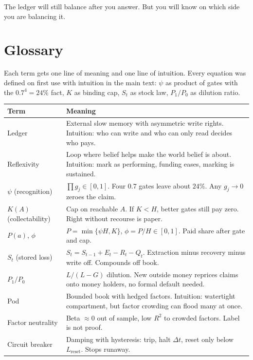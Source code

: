 \documentclass[11pt]{article}
\begin{document}
The ledger will still balance after you answer. But you will know on which side you are balancing it.

\appendix
\section{Glossary}
\label{app:glossary}

Each term gets one line of meaning and one line of intuition. Every equation was defined on first use with intuition in the main text: $\psi$ as product of gates with the $0.7^4=24\%$ fact, $K$ as binding cap, $S_t$ as stock law, $P_1/P_0$ as dilution ratio.

\begin{center}
\small
\begin{tabular}{p{2.9cm}p{9.1cm}}
\toprule
Term & Meaning \\
\midrule
Ledger & External slow memory with asymmetric write rights. Intuition: who can write and who can only read decides who pays. \\
Reflexivity & Loop where belief helps make the world belief is about. Intuition: mark as performing, funding eases, marking is sustained. \\
$\psi$ (recognition) & $\prod g_j\in[0,1]$. Four $0.7$ gates leave about $24\%$. Any $g_j\to0$ zeroes the claim. \\
$K(A)$ (collectability) & Cap on reachable $A$. If $K<H$, better gates still pay zero. Right without recourse is paper. \\
$P(a)$, $\phi$ & $P=\min\{\psi H,K\}$, $\phi=P/H\in[0,1]$. Paid share after gate and cap. \\
$S_t$ (stored loss) & $S_t=S_{t-1}+E_t-R_t-Q_t$. Extraction minus recovery minus write off. Compounds off book. \\
$P_1/P_0$ & $L/(L-G)$ dilution. New outside money reprices claims onto money holders, no formal default needed. \\
Pod & Bounded book with hedged factors. Intuition: watertight compartment, but factor crowding can flood many at once. \\
Factor neutrality & Beta $\approx0$ out of sample, low $R^2$ to crowded factors. Label is not proof. \\
Circuit breaker & Damping with hysteresis: trip, halt $\Delta t$, reset only below $L_{\text{reset}}$. Stops runaway. \\

\end{tabular}
\end{center}
\end{document}
